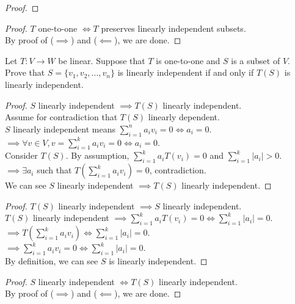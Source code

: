 \documentclass[12pt]{article}
\newenvironment{exercise}[2][Exercise]{\begin{trivlist}
\item[\hskip \labelsep{\bfseries #1}\hskip \labelsep{\bfseries #2.}]}{\end{trivlist}}
\begin{document}
\begin{exercise}{2.1.14a}
\begin{proof}
    \end{proof}

    \begin{proof} $T$ one-to-one $\iff T$ preserves linearly independent subsets. \\

        \noindent By proof of ($\implies$) and ($\impliedby$), we are done.

    \end{proof}

\end{exercise}

\begin{exercise}{2.1.14b} Let $T: V \rightarrow W$ be linear. 
    Suppose that $T$ is one-to-one and $S$ is a subset of $V$.
    Prove that $S = \{v_1, v_2, \dots, v_n\}$ is linearly independent if and only if $T(S)$ is linearly independent.

    \begin{proof} $S$ linearly independent $\implies T(S)$ linearly independent. \\

        \noindent Assume for contradiction that $T(S)$ linearly dependent. \\
        $S$ linearly independent means $\sum_{i=1}^{n} a_i v_i = 0 \iff a_i = 0$. \\
        $\implies \forall v \in V, v = \sum_{i=1}^{k} a_i v_i = 0 \iff a_i = 0$. \\ 
        Consider $T(S)$. By assumption, $\sum_{i=1}^{k} a_i T(v_i) = 0$ and $\sum_{i=1}^{k} |a_i| > 0$. \\
        $\implies \exists a_i$ such that $T(\sum_{i=1}^{k} a_i v_i) = 0$, contradiction. \\
        We can see $S$ linearly independent $\implies T(S)$ linearly independent.

    \end{proof}

    \begin{proof} $T(S)$ linearly independent $\implies S$ linearly independent. \\

        \noindent $T(S)$ linearly independent $\implies \sum_{i=1}^{k} a_i T(v_i) = 0 \iff \sum_{i=1}^{k} |a_i| = 0$. \\
        $\implies T(\sum_{i=1}^{k} a_i v_i) \iff \sum_{i=1}^{k} |a_i| = 0$. \\
        $\implies \sum_{i=1}^{k} a_i v_i = 0 \iff \sum_{i=1}^{k} |a_i| = 0$. \\
        By definition, we can see $S$ is linearly independent.

    \end{proof}

    \begin{proof} $S$ linearly independent $\iff T(S)$ linearly independent. \\

        \noindent By proof of ($\implies$) and ($\impliedby$), we are done.

    \end{proof}

\end{exercise}
\end{document}
